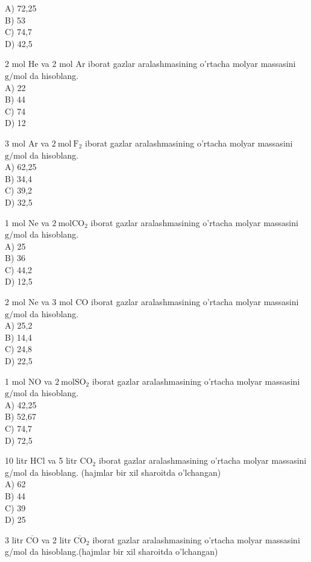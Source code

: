 A) 72,25\\
B) 53\\
C) 74,7\\
D) 42,5
  \item 2 mol He va 2 mol Ar iborat gazlar aralashmasining o'rtacha molyar massasini $\mathrm{g} / \mathrm{mol}$ da hisoblang.\\
A) 22\\
B) 44\\
C) 74\\
D) 12
  \item 3 mol Ar va $2 \mathrm{~mol} \mathrm{~F}_{2}$ iborat gazlar aralashmasining o'rtacha molyar massasini $\mathrm{g} / \mathrm{mol}$ da hisoblang.\\
A) 62,25\\
B) 34,4\\
C) 39,2\\
D) 32,5
  \item 1 mol Ne va $2 \mathrm{~mol} \mathrm{CO}_{2}$ iborat gazlar aralashmasining o'rtacha molyar massasini $\mathrm{g} / \mathrm{mol}$ da hisoblang.\\
A) 25\\
B) 36\\
C) 44,2\\
D) 12,5
  \item 2 mol Ne va 3 mol CO iborat gazlar aralashmasining o'rtacha molyar massasini $\mathrm{g} / \mathrm{mol}$ da hisoblang.\\
A) 25,2\\
B) 14,4\\
C) 24,8\\
D) 22,5
  \item 1 mol NO va $2 \mathrm{~mol} \mathrm{SO}_{2}$ iborat gazlar aralashmasining o'rtacha molyar massasini $\mathrm{g} / \mathrm{mol}$ da hisoblang.\\
A) 42,25\\
B) 52,67\\
C) 74,7\\
D) 72,5
  \item 10 litr HCl va 5 litr $\mathrm{CO}_{2}$ iborat gazlar aralashmasining o'rtacha molyar massasini g/mol da hisoblang. (hajmlar bir xil sharoitda o'lchangan)\\
A) 62\\
B) 44\\
C) 39\\
D) 25
  \item 3 litr $\overline{\mathrm{CO}}$ va 2 litr $\overline{\mathrm{CO}}_{2}$ iborat gazlar aralashmasining o'rtacha molyar massasini g/mol da hisoblang.(hajmlar bir xil sharoitda o'lchangan)\\
